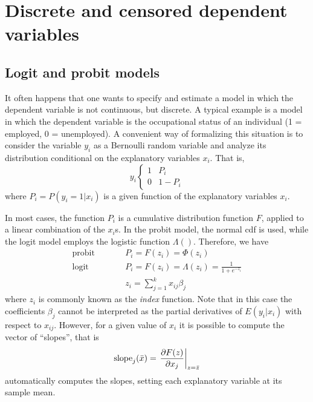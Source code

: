 \chapter{Discrete and censored dependent variables}
\label{chap:discr-models}

\section{Logit and probit models}
\label{sec:logit-probit}

It often happens that one wants to specify and estimate a model in
which the dependent variable is not continuous, but discrete. A
typical example is a model in which the dependent variable is the
occupational status of an individual (1 = employed, 0 = unemployed). A
convenient way of formalizing this situation is to consider the
variable $y_i$ as a Bernoulli random variable and analyze its
distribution conditional on the explanatory variables $x_i$.  That is,
%
\begin{equation}
  \label{eq:qr-Bernoulli}
  y_i \left\{ 
    \begin{array}{ll} 
      1 & P_i \\ 0 & 1 - P_i 
    \end{array}
    \right.
\end{equation}
%
where $P_i = P(y_i = 1 | x_i) $ is a given function of the explanatory
variables $x_i$.

In most cases, the function $P_i$ is a cumulative distribution
function $F$, applied to a linear combination of the $x_i$s. In the
probit model, the normal cdf is used, while the logit model employs
the logistic function $\Lambda()$. Therefore, we have
%
\begin{eqnarray}
  \label{eq:qr-link}
  \textrm{probit} & \qquad & P_i = F(z_i) = \Phi(z_i)  \\
  \textrm{logit}  & \qquad & P_i = F(z_i) = \Lambda(z_i) = \frac{1}{1 + e^{-z_i}} \\
  & &z_i = \sum_{j=1}^k x_{ij} \beta_j
\end{eqnarray}
%
where $z_i$ is commonly known as the \emph{index} function. Note that
in this case the coefficients $\beta_j$ cannot be interpreted as the
partial derivatives of $E(y_i | x_i)$ with respect to
$x_{ij}$.  However, for a given value of $x_i$ it is possible to
compute the vector of ``slopes'', that is
\[
  \mathrm{slope}_j(\bar{x}) = \left. \frac{\partial F(z)}{\partial x_j} \right|_{z =
    \bar{z}}
\]
 automatically computes the slopes, setting each
explanatory variable at its sample mean.


